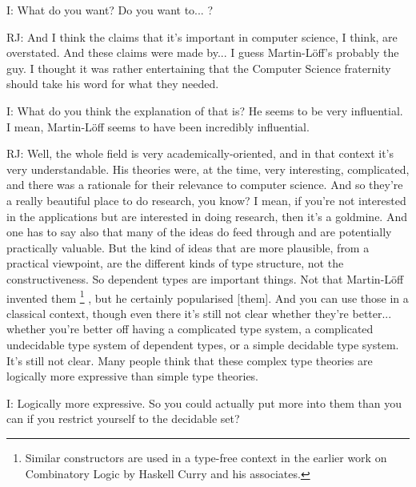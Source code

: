 \documentclass[10pt,titlepage]{book}
\def\ouml{\"o}
\begin{document}
I: What do you want?
Do you want to... ?

RJ: And I think the claims that it's important in computer science, I think, are overstated.
And these claims were made by... I guess Martin-L\"off's\index{Martin-L{\ouml}ff} probably the guy.
I thought it was rather entertaining that the Computer Science fraternity should take his word for what they needed.

I: What do you think the explanation of that is?
He seems to be very influential.
I mean, Martin-L\"off seems to have been incredibly influential.

RJ: Well, the whole field is very academically-oriented, and in that context it's very understandable.
His theories were, at the time, very interesting, complicated, and there was a rationale for their relevance to computer science.
And so they're a really beautiful place to do research, you know?
I mean, if you're not interested in the applications but are interested in doing research, then it's a goldmine.
And one has to say also that many of the ideas do feed through and are potentially practically valuable.
But the kind of ideas that are more plausible, from a practical viewpoint, are the different kinds of type structure, not the constructiveness.
So dependent types are important things.
Not that Martin-L\"off invented them%
\footnote{
Similar constructors are used in a type-free context in the earlier work on Combinatory Logic by Haskell Curry and his associates.
}%
, but he certainly popularised [them].
And you can use those in a classical context, though even there it's still not clear whether they're better... whether you're better off having a complicated type system, a complicated undecidable type system of dependent types, or a simple decidable type system.
It's still not clear.
Many people think that these complex type theories are logically more expressive than simple type theories.

I: Logically more expressive.
So you could actually put more into them than you can if you restrict yourself to the decidable set?
\end{document}
